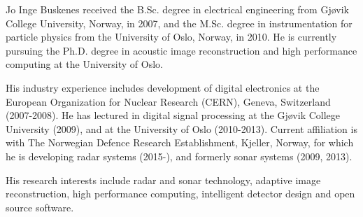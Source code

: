 
\begin{IEEEbiography}{Jo Inge Buskenes}
received the B.Sc. degree in electrical engineering from Gj\o{}vik College University, Norway, in 2007, and the M.Sc. degree in instrumentation for particle physics from the University of Oslo, Norway, in 2010. He is currently pursuing the Ph.D. degree in acoustic image reconstruction and high performance computing at the University of Oslo.

His industry experience includes development of digital electronics at the European Organization for Nuclear Research (CERN), Geneva, Switzerland (2007-2008). He has lectured in digital signal processing at the Gj\o{}vik College University (2009), and at the University of Oslo (2010-2013). Current affiliation is with The Norwegian Defence Research Establishment, Kjeller, Norway, for which he is developing radar systems (2015-), and formerly sonar systems (2009, 2013).

His research interests include radar and sonar technology, adaptive image reconstruction, high performance computing, intelligent detector design and open source software.
\end{IEEEbiography}